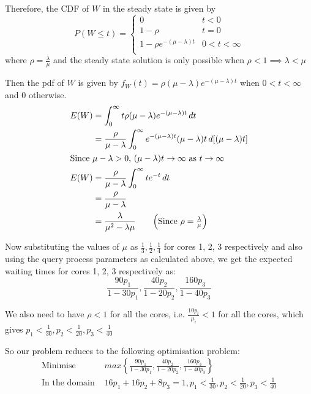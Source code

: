 \documentclass[12pt, oneside]{article}
\begin{document}
\begin{enumerate}
{    Therefore, the CDF of \(W\) in the steady state is given by
    \[
        P(W \leq t) = \begin{cases}
                        0 & t < 0 \\
                        1 - \rho & t = 0 \\
                        1 - \rho e^{-(\mu - \lambda)t} & 0 < t < \infty \\
                      \end{cases}
    \]
    where \(\rho = \frac{\lambda}{\mu}\) and the steady state solution is only possible
    when \(\rho < 1 \implies \lambda < \mu\)

    Then the pdf of \(W\) is given by \(f_W(t) = \rho(\mu - \lambda)e^{-(\mu - \lambda)t}\) when
    \(0 < t < \infty\) and 0 otherwise.
    \begin{align*}
        E(W) &= \int_0^\infty t \rho(\mu - \lambda)e^{-(\mu - \lambda)t} \,dt \\
             &= \frac{\rho}{\mu - \lambda} \int_0^\infty e^{-(\mu - \lambda)t} (\mu - \lambda) t \,d[(\mu - \lambda)t] \\
        \intertext{Since \(\mu - \lambda > 0\), \((\mu - \lambda)t \to \infty\) as \(t \to \infty\)}
        E(W) &= \frac{\rho}{\mu - \lambda} \int_0^\infty te^{-t}\,dt \\
             &= \frac{\rho}{\mu - \lambda} \\
             &= \frac{\lambda}{\mu^2 - \lambda\mu} \tag*{\(\left(\text{Since } \rho = \frac{\lambda}{\mu}\right)\)}
    \end{align*}

    Now substituting the values of \(\mu\) as \(\frac{1}{3}, \frac{1}{2}, \frac{1}{4}\) for
    cores 1, 2, 3 respectively and also using the query process parameters as calculated above,
    we get the expected waiting times for cores 1, 2, 3 respectively as:
    \[
        \frac{90p_1}{1 - 30p_1}, \frac{40p_2}{1 - 20p_2}, \frac{160p_3}{1 - 40p_3}
    \]
    
    We also need to have \(\rho < 1\) for all the cores, i.e. \(\frac{10p_i}{\mu_i} < 1\) 
    for all the cores, which gives \(p_1 < \frac{1}{30}, p_2 < \frac{1}{20}, p_3 < \frac{1}{40}\)

    So our problem reduces to the following optimisation problem:
    \begin{align*}
        \text{Minimise } &max\left\{\frac{90p_1}{1 - 30p_1}, \frac{40p_2}{1 - 20p_2}, \frac{160p_3}{1 - 40p_3}\right\} \\
        \text{In the domain } &16p_1 + 16p_2 + 8p_3 = 1, p_1 < \frac{1}{30}, p_2 < \frac{1}{20}, p_3 < \frac{1}{40}
    \end{align*}

}
\end{enumerate}
\end{document}
